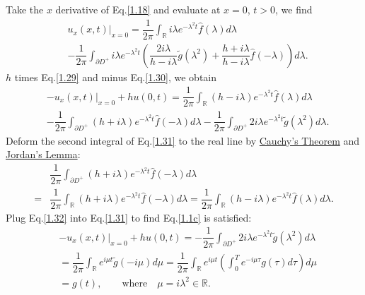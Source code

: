 \documentclass[12pt]{article}
\numberwithin{equation}{section}
\begin{document}
Take the $x$ derivative of Eq.\eqref{1.18} and evaluate at $x=0$, $t>0$, we find
\begin{equation}\label{1.30}
    \begin{split}
        &u_x(x,t)|_{x=0}=\dfrac{1}{2\pi}\int_{\mathbb{R}}i\lambda e^{-\lambda^2 t}\hat{f}(\lambda)d\lambda\\
        &-\dfrac{1}{2\pi} \int_{\partial D^+} i\lambda e^{-\lambda^2 t}\left(\dfrac{2i\lambda}{h-i\lambda}\tilde{g}(\lambda^2)+\dfrac{h+i\lambda}{h-i\lambda}\hat{f}(-\lambda)\right) d\lambda.
    \end{split}
\end{equation}
$h$ times Eq.\eqref{1.29} and minus Eq.\eqref{1.30}, we obtain
\begin{equation}\label{1.31}
    \begin{split}
        &-u_x(x,t)|_{x=0}+hu(0,t)=\dfrac{1}{2\pi}\int_{\mathbb{R}}(h-i\lambda) e^{-\lambda^2 t}\hat{f}(\lambda)d\lambda\\
        &-\dfrac{1}{2\pi} \int_{\partial D^+} (h+i\lambda)e^{-\lambda^2 t}\hat{f}(-\lambda)d\lambda-\dfrac{1}{2\pi}\int_{\partial D^+}2i\lambda e^{-\lambda^2 t} \tilde{g}(\lambda^2)d\lambda.
    \end{split}
\end{equation}
Deform the second integral of Eq.\eqref{1.31} to the real line by \href{https://w.wiki/9aTM}{Cauchy's Theorem} and \href{https://w.wiki/9aSw}{Jordan's Lemma}:
\begin{equation}\label{1.32}
    \begin{split}
    &\dfrac{1}{2\pi}\int_{\partial D^+} (h+i\lambda) e^{-\lambda^2 t}\hat{f}(-\lambda) d\lambda\\
    =&\dfrac{1}{2\pi}\int_{\mathbb{R}} (h+i\lambda)e^{-\lambda^2 t} \hat{f}(-\lambda)d\lambda=\dfrac{1}{2\pi}\int_{\mathbb{R}} (h-i\lambda) e^{-\lambda^2 t}\hat{f}(\lambda)d\lambda.
    \end{split}
\end{equation}
Plug Eq.\eqref{1.32} into Eq.\eqref{1.31} to find Eq.\eqref{1.1c} is satisfied:
\begin{equation}\label{1.33}
    \begin{split}
        &-u_x(x,t)|_{x=0}+hu(0,t)=-\dfrac{1}{2\pi} \int_{\partial D^+} 2i\lambda e^{-\lambda^2 t}\tilde{g}(\lambda^2)d\lambda\\
        &=\dfrac{1}{2\pi} \int_{\mathbb{R}} e^{i\mu t}\tilde{g}(-i \mu)d\mu=\dfrac{1}{2\pi}\int_{\mathbb{R}}e^{i\mu t}\left(\int_{0}^{T}e^{-i\mu \tau} g(\tau)d\tau\right)d\mu\\
        &=g(t), \qquad \text{where}\quad \mu=i\lambda^2\in\mathbb{R}.
    \end{split}
\end{equation}
\end{document}
